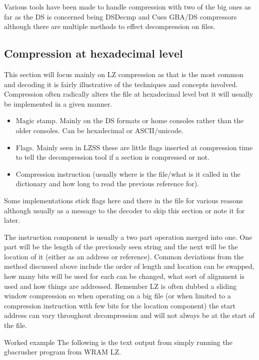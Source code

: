 \documentclass[
]{book}
\providecommand{\tightlist}{%
  \setlength{\itemsep}{0pt}\setlength{\parskip}{0pt}}
\begin{document}
Various tools have been made to handle compression with two of the big ones as far as the DS is concerned being DSDecmp and Cues GBA/DS compressors although there are multiple methods to effect decompression on files.

\hypertarget{compression-at-hexadecimal-level}{%
\subsection{Compression at hexadecimal level}\label{compression-at-hexadecimal-level}}

This section will focus mainly on LZ compression as that is the most common and decoding it is fairly illustrative of the techniques and concepts involved. Compression often radically alters the file at hexadecimal level but it will usually be implemented in a given manner.

\begin{itemize}
\tightlist
\item
  Magic stamp. Mainly on the DS formats or home consoles rather than the older consoles. Can be hexadecimal or ASCII/unicode.
\item
  Flags. Mainly seen in LZSS these are little flags inserted at compression time to tell the decompression tool if a section is compressed or not.
\item
  Compression instruction (usually where is the file/what is it called in the dictionary and how long to read the previous reference for).
\end{itemize}

Some implementations stick flags here and there in the file for various reasons although usually as a message to the decoder to skip this section or note it for later.

The instruction component is usually a two part operation merged into one. One part will be the length of the previously seen string and the next will be the location of it (either as an address or reference). Common deviations from the method discussed above include the order of length and location can be swapped, how many bits will be used for each can be changed, what sort of alignment is used and how things are addressed. Remember LZ is often dubbed a sliding window compression so when operating on a big file (or when limited to a compression instruction with few bits for the location component) the start address can vary throughout decompression and will not always be at the start of the file.

Worked example The following is the text output from simply running the gbacrusher program from WRAM LZ.
\end{document}
